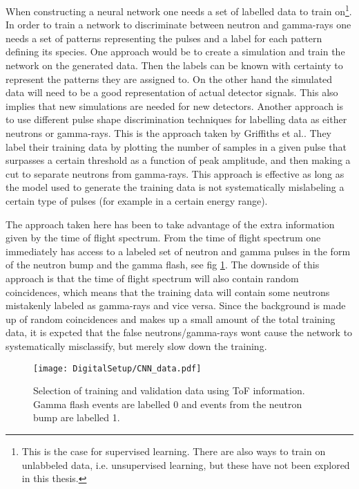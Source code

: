 \documentclass[main.tex]{subfiles}
\begin{document}
When constructing a neural network one needs a set of labelled data to train on\footnote{This is the case for supervised learning. There are also ways to train on unlabbeled data, i.e. unsupervised learning, but these have not been explored in this thesis.}. In order to train a network to discriminate between neutron and gamma-rays one needs a set of patterns representing the pulses and a label for each pattern defining its species. One approach would be to create a simulation and train the network on the generated data. Then the labels can be known with certainty to represent the patterns they are assigned to. On the other hand the simulated data will need to be a good representation of actual detector signals. This also implies that new simulations are needed for new detectors. Another approach is to use different pulse shape discrimination techniques for labelling data as either neutrons or gamma-rays. This is the approach taken by  Griffiths et al.\cite{Griffiths}. They label their training data by plotting the number of samples in a given pulse that surpasses a certain threshold as a function of peak amplitude, and then making a cut to separate neutrons from gamma-rays. This approach is effective as long as the model used to generate the training data is not systematically mislabeling a certain type of pulses (for example in a certain energy range). 

The approach taken here has been to take advantage of the extra information given by the time of flight spectrum. From the time of flight spectrum one immediately has access to a labeled set of neutron and gamma pulses in the form of the neutron bump and the gamma flash, see fig \ref{fig:CNN_data}. The downside of this approach is that the time of flight spectrum will also contain random coincidences, which means that the training data will contain some neutrons mistakenly labeled as gamma-rays and vice versa. Since the background is made up of random coincidences and makes up a small amount of the total training data, it is expcted that the false neutrons/gamma-rays wont cause the network to systematically misclassify, but merely slow down the training.

\begin{figure}[ht!]
    \centering
        \texttt{[image: DigitalSetup/CNN\_data.pdf]}
        \caption[Selection of training and validation data]{Selection of training and validation data using ToF information. Gamma flash events are labelled 0 and events from the neutron bump are labelled 1.}
    \label{fig:CNN_data} 
\end{figure}
\end{document}
